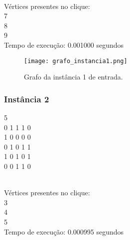 \documentclass[12pt]{article}
\begin{document}
        \begin{tcolorbox}[title=Saída da instância 1, width=\linewidth, 
          fontupper=\ttfamily, 
          halign=flush left]
            [0, 0, 0, 0, 0, 0, 1, 1, 1] \\
            Vértices presentes no clique: \\
            7 \\
            8 \\
            9 \\
            Tempo de execução: 0.001000 segundos \\
        \end{tcolorbox}

        \begin{figure}[H]
            \centering
            \texttt{[image: grafo\_instancia1.png]}
            \caption{Grafo da instância 1 de entrada.}
            \label{fig:instancia1}
        \end{figure}

    \subsubsection{Instância 2}
        \begin{tcolorbox}[title=Arquivo de entrada para a instância 2, width=\linewidth, 
          fontupper=\ttfamily, 
          halign=flush left]
            5 \\
            0 1 1 1 0 \\
            1 0 0 0 0 \\
            0 1 0 1 1 \\
            1 0 1 0 1 \\
            0 0 1 1 0 \\
        \end{tcolorbox}

        \begin{tcolorbox}[title=Saída da instância 2, width=\linewidth, 
          fontupper=\ttfamily, 
          halign=flush left]
            [0, 0, 1, 1, 1] \\
            Vértices presentes no clique: \\
            3 \\
            4 \\
            5 \\
            Tempo de execução: 0.000995 segundos \\
        \end{tcolorbox}
\end{document}
